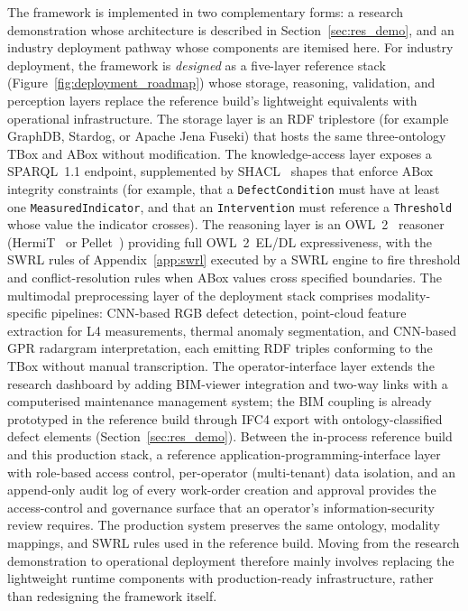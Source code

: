 \documentclass[11pt,a4paper]{article}
\begin{document}
The framework is implemented in two complementary forms: a research demonstration whose architecture is described in Section~\ref{sec:res_demo}, and an industry deployment pathway whose components are itemised here. For industry deployment, the framework is \emph{designed} as a five-layer reference stack (Figure~\ref{fig:deployment_roadmap}) whose storage, reasoning, validation, and perception layers replace the reference build's lightweight equivalents with operational infrastructure. The storage layer is an RDF triplestore (for example GraphDB, Stardog, or Apache Jena Fuseki) that hosts the same three-ontology TBox and ABox without modification. The knowledge-access layer exposes a SPARQL~1.1 endpoint, supplemented by SHACL~\citep{w3c2017shacl} shapes that enforce ABox integrity constraints (for example, that a \texttt{DefectCondition} must have at least one \texttt{MeasuredIndicator}, and that an \texttt{Intervention} must reference a \texttt{Threshold} whose value the indicator crosses). The reasoning layer is an OWL~2~\citep{w3c2012owl2} reasoner (HermiT~\citep{glimm2014hermit} or Pellet~\citep{sirin2007pellet}) providing full OWL~2~EL/DL expressiveness, with the SWRL rules of Appendix~\ref{app:swrl} executed by a SWRL engine to fire threshold and conflict-resolution rules when ABox values cross specified boundaries. The multimodal preprocessing layer of the deployment stack comprises modality-specific pipelines: CNN-based RGB defect detection, point-cloud feature extraction for L4 measurements, thermal anomaly segmentation, and CNN-based GPR radargram interpretation, each emitting RDF triples conforming to the TBox without manual transcription. The operator-interface layer extends the research dashboard by adding BIM-viewer integration and two-way links with a computerised maintenance management system; the BIM coupling is already prototyped in the reference build through IFC4 export with ontology-classified defect elements (Section~\ref{sec:res_demo}). Between the in-process reference build and this production stack, a reference application-programming-interface layer with role-based access control, per-operator (multi-tenant) data isolation, and an append-only audit log of every work-order creation and approval provides the access-control and governance surface that an operator's information-security review requires. The production system preserves the same ontology, modality mappings, and SWRL rules used in the reference build. Moving from the research demonstration to operational deployment therefore mainly involves replacing the lightweight runtime components with production-ready infrastructure, rather than redesigning the framework itself.
\end{document}
